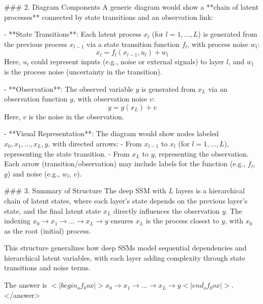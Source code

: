 ### 2. Diagram Components  
A generic diagram would show a **chain of latent processes** connected by state transitions and an observation link:  

- **State Transitions**: Each latent process \( x_l \) (for \( l = 1, \dots, L \)) is generated from the previous process \( x_{l-1} \) via a state transition function \( f_l \), with process noise \( w_l \):  
  \[
  x_l = f_l(x_{l-1}, u_l) + w_l
  \]  
  Here, \( u_l \) could represent inputs (e.g., noise or external signals) to layer \( l \), and \( w_l \) is the process noise (uncertainty in the transition).  

- **Observation**: The observed variable \( y \) is generated from \( x_L \) via an observation function \( g \), with observation noise \( v \):  
  \[
  y = g(x_L) + v
  \]  
  Here, \( v \) is the noise in the observation.  

- **Visual Representation**: The diagram would show nodes labeled \( x_0, x_1, \dots, x_L, y \), with directed arrows:  
  - From \( x_{l-1} \) to \( x_l \) (for \( l = 1, \dots, L \)), representing the state transition.  
  - From \( x_L \) to \( y \), representing the observation.  
  Each arrow (transition/observation) may include labels for the function (e.g., \( f_l \), \( g \)) and noise (e.g., \( w_l \), \( v \)).  


### 3. Summary of Structure  
The deep SSM with \( L \) layers is a hierarchical chain of latent states, where each layer’s state depends on the previous layer’s state, and the final latent state \( x_L \) directly influences the observation \( y \). The indexing \( x_0 \to x_1 \to \dots \to x_L \to y \) ensures \( x_L \) is the process closest to \( y \), with \( x_0 \) as the root (initial) process.  


This structure generalizes how deep SSMs model sequential dependencies and hierarchical latent variables, with each layer adding complexity through state transitions and noise terms.  

The answer is \(<|begin_of_box|>x_0 \to x_1 \to \dots \to x_L \to y<|end_of_box|>\).</answer>